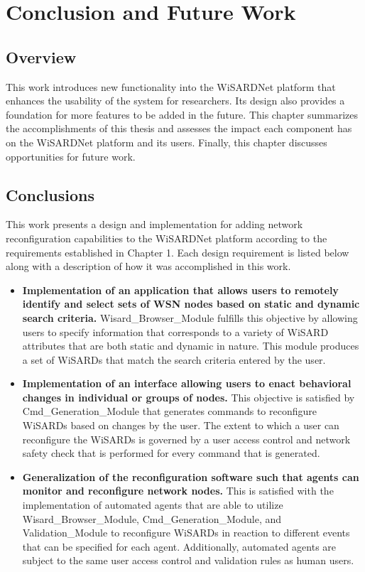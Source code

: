 
\chapter{Conclusion and Future Work}
\label{Chapter 7}


\section{Overview}
This work introduces new functionality into the WiSARDNet platform that enhances the usability of the system for researchers. Its design also provides a foundation for more features to be added in the future. This chapter summarizes the accomplishments of this thesis and assesses the impact each component has on the WiSARDNet platform and its users. Finally, this chapter discusses opportunities for future work. 

\section{Conclusions}
This work presents a design and implementation for adding network reconfiguration capabilities to the WiSARDNet platform according to the requirements established in Chapter 1. Each design requirement is listed below along with a description of how it was accomplished in this work.

\begin{itemize}
	\item \textbf{Implementation of an application that allows users to remotely identify and select sets of WSN nodes based on static and dynamic search criteria.} Wisard\_Browser\_Module fulfills this objective by allowing users to specify information that corresponds to a variety of WiSARD attributes that are both static and dynamic in nature. This module produces a set of WiSARDs that match the search criteria entered by the user. 

	\item \textbf{Implementation of an interface allowing users to enact behavioral changes in individual or groups of nodes.} This objective is satisfied by Cmd\_Generation\_Module that generates commands to reconfigure WiSARDs based on changes by the user. The extent to which a user can reconfigure the WiSARDs is governed by a user access control  and network safety check that is performed for every command that is generated.

	\item \textbf{Generalization of the reconfiguration software such that agents can monitor and reconfigure network nodes.} This is satisfied with the implementation of automated agents that are able to utilize Wisard\_Browser\_Module, Cmd\_Generation\_Module, and Validation\_Module to reconfigure WiSARDs in reaction to different events that can be specified for each agent. Additionally, automated agents are subject to the same user access control and validation rules as human users.
\end{itemize}


